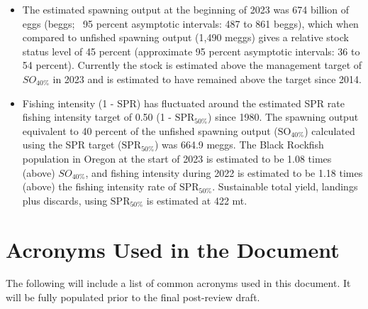 \documentclass[11pt,
  letterpaper,
]{article}
\begin{document}
\begin{itemize}
\item The estimated spawning output at the beginning of 2023 was 674 billion of eggs (beggs; ~95 percent asymptotic intervals: 487 to 861 beggs), which when compared to unfished spawning output (1,490 meggs) gives a relative stock status level of 45 percent (approximate 95 percent asymptotic intervals: 36 to 54 percent).  Currently the stock is estimated above the management target of $SO_{40\%}$ in 2023 and is estimated to have remained above the target since 2014.

\item  Fishing intensity (1 - SPR) has fluctuated around the estimated SPR rate fishing intensity target of 0.50 (1 - $\text{SPR}_{50\%}$) since 1980. The spawning output equivalent to 40 percent of the unfished spawning output ($\text{SO}_{40\%}$) calculated using the SPR target ($\text{SPR}_{50\%}$) was 664.9 meggs. The Black Rockfish population in Oregon at the start of 2023 is estimated to be 1.08 times (above) $SO_{40\%}$, and fishing intensity during 2022 is estimated to be 1.18 times (above) the fishing intensity rate of $\text{SPR}_{50\%}$. Sustainable total yield, landings plus discards, using $\text{SPR}_{50\%}$ is estimated at 422 mt.   

\end{itemize}

\newpage

\hypertarget{acronyms-used-in-the-document}{%
\section*{Acronyms Used in the Document}\label{acronyms-used-in-the-document}}

The following will include a list of common acronyms used in this document. It will be fully populated prior to the final post-review draft.
\end{document}
